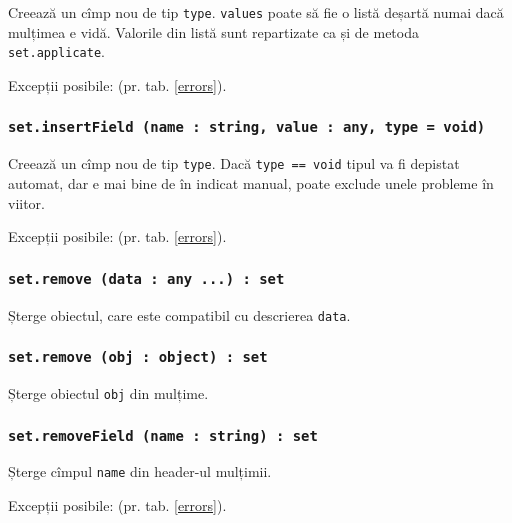 Creează un cîmp nou de tip \texttt{type}. \texttt{values} poate să fie o listă deșartă numai dacă mulțimea e vidă. Valorile din listă sunt repartizate ca și de metoda \texttt{set.applicate}.

Excepții posibile:  (pr. tab. \ref{errors}).

\subsubsection{\texttt{set.insertField (name : string, value : any, type = void)}}

Creează un cîmp nou de tip \texttt{type}. Dacă \texttt{type == void} tipul va fi depistat automat, dar e mai bine de în indicat manual, poate exclude unele probleme în viitor.

Excepții posibile:  (pr. tab. \ref{errors}).

\subsubsection{\texttt{set.remove (data : any ...) : set}}

Șterge obiectul, care este compatibil cu descrierea \texttt{data}.

\subsubsection{\texttt{set.remove (obj : object) : set}}

Șterge obiectul \texttt{obj} din mulțime.

\subsubsection{\texttt{set.removeField (name : string) : set}}

Șterge cîmpul \texttt{name} din header-ul mulțimii.

Excepții posibile:  (pr. tab. \ref{errors}).


